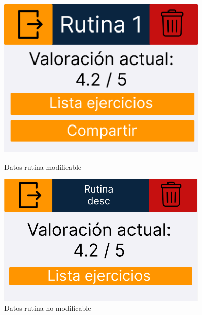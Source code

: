 \begin{figure}[H]
   \centering
   \begin{minipage}{0.45\textwidth}
      \centering
      \includegraphics[width=0.9\textwidth]{fotos/Frame 48.png}
      \caption{Datos rutina modificable}
      \label{fig:Datos rutina modificable}
   \end{minipage}%
   \hspace{0.5cm}
   \begin{minipage}{0.45\textwidth}
      \centering
      \includegraphics[width=0.9\textwidth]{fotos/Frame 49.png}
      \caption{Datos rutina no modificable}
      \label{fig:Datos rutina no modificable}
   \end{minipage}
\end{figure}


